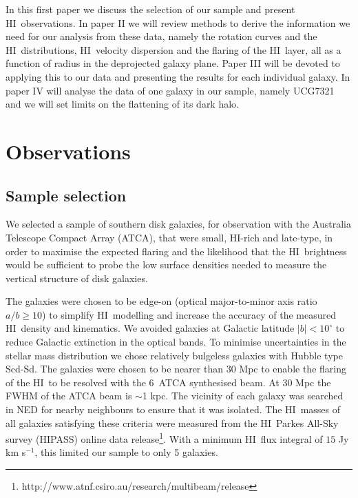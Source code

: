 \documentclass[traditabstract]{aa} %
\newcommand\HI{H{\small I}}
\newcommand\kms{km s$^{-1}$}
\begin{document}
In this first paper we discuss the selection of our sample and present \HI\
observations. In paper II we will review methods to derive the information we
need for our analysis from these data, namely the rotation curves and the \HI\
distributions, \HI\ velocity dispersion and the flaring of the \HI\ layer, all
as a function of radius in the deprojected galaxy plane. Paper III will be
devoted to applying this to our data and presenting the results for each
individual galaxy. In paper IV will analyse the data of one galaxy in our
sample, namely UCG7321 and we will set limits on the flattening of its 
dark halo. 

\section{Observations}
\label{sec:obs-HI}

\subsection{Sample selection}

We selected a sample of southern disk galaxies, for observation
with the Australia Telescope Compact Array (ATCA), that were small,
\HI-rich and late-type, in order to maximise the expected flaring
and the likelihood that the \HI\ brightness would be sufficient to
probe the low surface densities needed to measure the vertical
structure of disk galaxies. 

The galaxies were chosen to be edge-on (optical major-to-minor axis
ratio $a/b \geq 10$) to simplify \HI\ modelling and increase the
accuracy of the measured \HI\ density and kinematics.  We avoided 
galaxies at
Galactic latitude $|b|<10^{\circ}$ to reduce
Galactic extinction in the optical bands. To minimise uncertainties in the
stellar mass distribution we chose relatively bulgeless galaxies
with Hubble type Scd-Sd. The galaxies were
chosen to be nearer than $30$ Mpc to enable the flaring of the \HI\ to be
resolved with the $6$\arcsec\ ATCA synthesised beam. At $30$ Mpc the 
FWHM of the
ATCA beam is $\sim$1 kpc.  The vicinity of each galaxy was searched
in NED for nearby neighbours to ensure that it was isolated. The
\HI\ masses of all galaxies satisfying these criteria were measured
from the \HI\ Parkes All-Sky survey (HIPASS) online data
release\footnote{http://www.atnf.csiro.au/research/multibeam/release}.
With a minimum \HI\ flux integral of $15$ Jy \kms, this limited our
sample to only 5 galaxies. 
\end{document}
